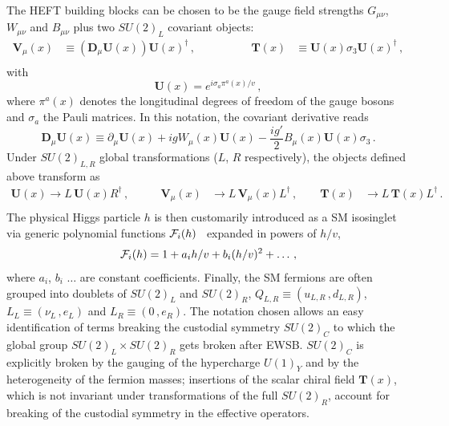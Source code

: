 \documentclass[11pt]{article}
\newcommand{\T}{\mathbf{T}}
\newcommand{\U}{\mathbf{U}}
\newcommand{\V}{\mathbf{V}}
\newcommand{\derp}{\partial}
\newcommand{\beq}{\begin{equation}}
\newcommand{\eeq}{\end{equation}}
\renewcommand{\[}{\begin{equation}}
\renewcommand{\]}{\end{equation}}
\newcommand{\DLR}{\mathbf{D}}
\def\cF{{\cal F}}
\begin{document}
The HEFT building blocks can be chosen to be the gauge field strengths $G_{\mu\nu}$, $W_{\mu\nu}$ and $B_{\mu\nu}$  plus two $SU(2)_L$ covariant objects:
\beq
\begin{aligned}
\V_\mu(x)&\equiv \left(\DLR_\mu\U(x)\right)\U(x)^\dag\, , \qquad \qquad  &\,\T(x)&\equiv \U(x)\sigma_3\U(x)^\dag\,,\\
\end{aligned}
\eeq
with
\beq
\U(x)=e^{i\sigma_a \pi^a(x)/v}\, , 
\eeq
 where $\pi^a(x)$ denotes the longitudinal degrees of freedom of the gauge bosons and  $\sigma_a$  the Pauli matrices. In this notation, the   
 covariant derivative reads
\beq
\DLR_\mu \U(x) \equiv \derp_\mu \U(x) +igW_{\mu}(x)\U(x) - \dfrac{ig'}{2} B_\mu(x) \U(x)\sigma_3 \,.
\eeq
Under $SU(2)_{L,R}$ 
global transformations ($L$, $R$ respectively), the objects defined above transform as 
\beq
\begin{aligned}
\U(x) \rightarrow L\, \U(x) R^\dagger\, , \qquad  &\V_\mu(x) &\rightarrow L\, \V_\mu(x) L^\dagger\,,\qquad \T(x) &\rightarrow L\, \T(x) L^\dagger\,.\\
\end{aligned}
\eeq
The physical Higgs particle $h$ is then customarily introduced as a SM isosinglet  via generic polynomial  
functions $\cF_i(h)$~\cite{Grinstein:2007iv} expanded in powers of $h/v$,
\beq
\cF_i(h)=1+ a_i h/v + b_i (h/v)^2+\ldots\,,
\label{F_def}
\eeq
 where $a_i$, $b_i$ $\ldots$ are constant coefficients. Finally, the SM fermions are often grouped into doublets of $SU(2)_L$ 
and $SU(2)_R$, $Q_{L,R}\equiv(u_{L,R}\,, d_{L,R})$, $L_L\equiv(\nu_L\,, e_L)$ and $L_R\equiv(0\,, e_R)$. The 
notation chosen allows an easy identification of  terms breaking the custodial symmetry $SU(2)_C$ to which the global group $SU(2)_L\times SU(2)_R$ gets broken after  EWSB.  $SU(2)_C$ is explicitly broken by the gauging of the hypercharge $U(1)_Y$ and 
by the heterogeneity of the fermion masses; insertions of the scalar chiral field $\T(x)$, which is not invariant under transformations of the 
full $SU(2)_R$, account for breaking of the custodial symmetry in the effective operators.
\end{document}
